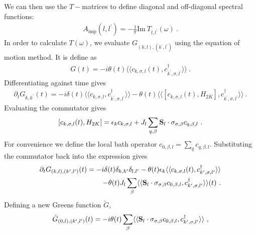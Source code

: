 We can then use the \(T-\)matrices to define diagonal and off-diagonal spectral functions:
\begin{equation}\begin{aligned}
	A_\text{imp}(l,l^\prime) = -\frac{1}{\pi}\text{Im}~T_{l,l^\prime}(\omega)~.
\end{aligned}\end{equation}
In order to calculate \(T(\omega)\), we evaluate \(G_{(k,l),(k^\prime,l^\prime)}\) using the equation of motion method. It is define as
\begin{equation}\begin{aligned}
	G(t) = -i \theta(t) \langle \langle c_{k,\sigma,l}(t), c^\dagger_{k^\prime,\sigma,l^\prime} \rangle  \rangle~.
\end{aligned}\end{equation}
Differentiating against time gives
\begin{equation}\begin{aligned}
	\partial_t G_{k,k^\prime}(t) = -i \delta(t) \langle \langle c_{k,\sigma,l}, c^\dagger_{k^\prime,\sigma,l^\prime} \rangle  \rangle - \theta(t) \langle \langle [ c_{k,\sigma,l}(t), H_{2K} ], c^\dagger_{k^\prime,\sigma,l^\prime} \rangle  \rangle~.
\end{aligned}\end{equation}
Evaluating the commutator gives
\begin{equation}\begin{aligned}
	\relax[c_{k,\sigma,l}(t), H_{2K}] = \epsilon_k c_{k,\sigma,l} + J_l\sum_{q,\beta} {\bf S}_l\cdot \sigma_{\sigma,\beta} c_{q,\beta,l}~.
\end{aligned}\end{equation}
For convenience we define the local bath operator \(c_{0,\beta,l} = \sum_q c_{q,\beta,l}\). Substituting the commutator back into the expression gives
\begin{equation}\begin{aligned}
	\partial_t G_{(k,l),(k^\prime,l^\prime)}(t) = -i \delta(t) \delta_{k,k^\prime} \delta_{l,l^\prime} - \theta(t) \epsilon_k \langle \langle c_{k,\sigma,l}(t), c^\dagger_{k^\prime,\sigma,l^\prime} \rangle  \rangle \\
	- \theta(t) J_l \sum_\beta \langle \langle {\bf S}_l\cdot \sigma_{\sigma,\beta} c_{0,\beta,l}, c^\dagger_{k^\prime,\sigma,l^\prime} \rangle  \rangle(t)~.
\end{aligned}\end{equation}
Defining a new Greens function \(\tilde G\),
\begin{equation}\begin{aligned}
	\tilde G_{(0,l), (k^\prime,l^\prime)}(t) = -i\theta(t)\sum_\beta \langle \langle {\bf S}_l\cdot \sigma_{\sigma,\beta} c_{0,\beta,l}, c^\dagger_{k^\prime,\sigma,l^\prime} \rangle  \rangle~,
\end{aligned}\end{equation}
